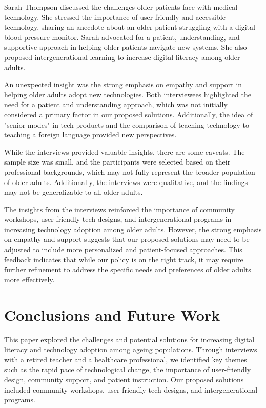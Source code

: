 \documentclass{article} %
\begin{document}
Sarah Thompson discussed the challenges older patients face with medical technology. She stressed the importance of user-friendly and accessible technology, sharing an anecdote about an older patient struggling with a digital blood pressure monitor. Sarah advocated for a patient, understanding, and supportive approach in helping older patients navigate new systems. She also proposed intergenerational learning to increase digital literacy among older adults.

An unexpected insight was the strong emphasis on empathy and support in helping older adults adopt new technologies. Both interviewees highlighted the need for a patient and understanding approach, which was not initially considered a primary factor in our proposed solutions. Additionally, the idea of "senior modes" in tech products and the comparison of teaching technology to teaching a foreign language provided new perspectives.

While the interviews provided valuable insights, there are some caveats. The sample size was small, and the participants were selected based on their professional backgrounds, which may not fully represent the broader population of older adults. Additionally, the interviews were qualitative, and the findings may not be generalizable to all older adults.

The insights from the interviews reinforced the importance of community workshops, user-friendly tech designs, and intergenerational programs in increasing technology adoption among older adults. However, the strong emphasis on empathy and support suggests that our proposed solutions may need to be adjusted to include more personalized and patient-focused approaches. This feedback indicates that while our policy is on the right track, it may require further refinement to address the specific needs and preferences of older adults more effectively.

\section{Conclusions and Future Work}
\label{sec:conclusion}

This paper explored the challenges and potential solutions for increasing digital literacy and technology adoption among ageing populations. Through interviews with a retired teacher and a healthcare professional, we identified key themes such as the rapid pace of technological change, the importance of user-friendly design, community support, and patient instruction. Our proposed solutions included community workshops, user-friendly tech designs, and intergenerational programs.
\end{document}
